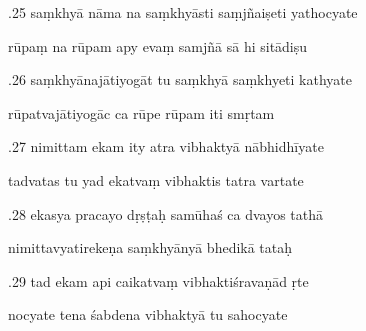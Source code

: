 \documentclass[article,12pt,a4paper]{memoir}%
\newcounter{parCount}
\begin{document}
	  
	  \pstart {}.25 saṃkhyā nāma na saṃkhyāsti saṃjñaiṣeti yathocyate 
	{}
	\pend%
      

	  
	  \pstart \leavevmode%
	rūpaṃ na rūpam apy evaṃ samjñā sā hi sitādiṣu 
	{}
	\pend%
      

	  
	  \pstart {}.26 saṃkhyānajātiyogāt tu saṃkhyā saṃkhyeti kathyate 
	{}
	\pend%
      

	  
	  \pstart \leavevmode%
	rūpatvajātiyogāc ca rūpe rūpam iti smṛtam 
	{}
	\pend%
      

	  
	  \pstart {}.27 nimittam ekam ity atra vibhaktyā nābhidhīyate 
	{}
	\pend%
      

	  
	  \pstart \leavevmode%
	tadvatas tu yad ekatvaṃ vibhaktis tatra vartate 
	{}
	\pend%
      

	  
	  \pstart {}.28 ekasya pracayo dṛṣṭaḥ samūhaś ca dvayos tathā 
	{}
	\pend%
      

	  
	  \pstart \leavevmode%
	nimittavyatirekeṇa saṃkhyānyā bhedikā tataḥ 
	{}
	\pend%
      

	  
	  \pstart {}.29 tad ekam api caikatvaṃ vibhaktiśravaṇād ṛte 
	{}
	\pend%
      

	  
	  \pstart \leavevmode%
	nocyate tena śabdena vibhaktyā tu sahocyate 
	{}
	\pend%
      
\end{document}
